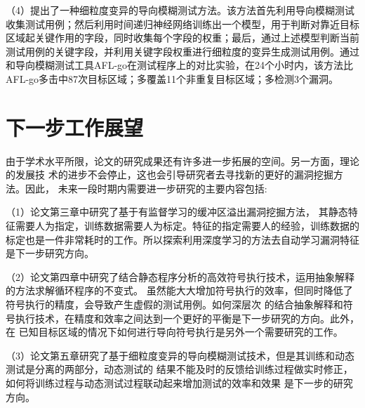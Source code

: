 （4）提出了一种细粒度变异的导向模糊测试方法。该方法首先利用导向模糊测试收集测试用例；然后利用时间递归神经网络训练出一个模型，用于判断对靠近目标区域起关键作用的字段，同时收集每个字段的权重；最后，通过上述模型判断当前测试用例的关键字段，并利用关键字段权重进行细粒度的变异生成测试用例。通过和导向模糊测试工具AFL-go在测试程序上的对比实验，在24个小时内，该方法比AFL-go多击中87次目标区域；多覆盖11个非重复目标区域；多检测3个漏洞。


\section{下一步工作展望}
由于学术水平所限，论文的研究成果还有许多进一步拓展的空间。另一方面，理论的发展技
术的进步不会停止，这也会引导研究者去寻找新的更好的漏洞挖掘方法。因此，
未来一段时期内需要进一步研究的主要内容包括:

（1）论文第三章中研究了基于有监督学习的缓冲区溢出漏洞挖掘方法，
其静态特征需要人为指定，训练数据需要人为标定。特征的指定需要人的经验，训练数据的
标定也是一件非常耗时的工作。所以探索利用深度学习的方法去自动学习漏洞特征是下一步研究方向。

（2）论文第四章中研究了结合静态程序分析的高效符号执行技术，运用抽象解释的方法求解循环程序的不变式。
虽然能大大增加符号执行的效率，但同时降低了符号执行的精度，会导致产生虚假的测试用例。如何深层次
的结合抽象解释和符号执行技术，在精度和效率之间达到一个更好的平衡是下一步研究的方向。此外，在
已知目标区域的情况下如何进行导向符号执行是另外一个需要研究的工作。

（3）论文第五章研究了基于细粒度变异的导向模糊测试技术，但是其训练和动态测试是分离的两部分，动态测试的
结果不能及时的反馈给训练过程做实时修正，如何将训练过程与动态测试过程联动起来增加测试的效率和效果
是下一步的研究方向。
